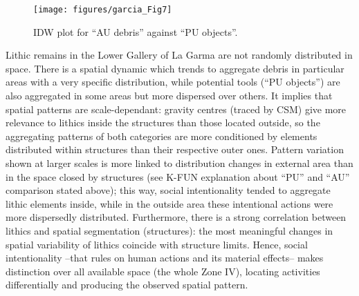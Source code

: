 \begin{figure}
	\texttt{[image: figures/garcia\_Fig7]}
	\centering
	\caption{IDW plot for “AU debris” against “PU objects”.}
	\label{fig:Garcia_Fig7}
\end{figure}


Lithic remains in the Lower Gallery of La Garma are not randomly distributed in space. There is a spatial dynamic which trends to aggregate debris in particular areas with a very specific distribution, while potential tools (“PU objects”) are also aggregated in some areas but more dispersed over others. It implies that spatial patterns are scale-dependant: gravity centres (traced by CSM) give more relevance to lithics inside the structures than those located outside, so the aggregating patterns of both categories are more conditioned by elements distributed within structures than their respective outer ones. Pattern variation shown at larger scales is more linked to distribution changes in external area than in the space closed by structures (see K-FUN explanation about “PU” and “AU” comparison stated above); this way, social intentionality tended to aggregate lithic elements inside, while in the outside area these intentional actions were more dispersedly distributed. Furthermore, there is a strong correlation between lithics and spatial segmentation (structures): the most meaningful changes in spatial variability of lithics coincide with structure limits. Hence, social intentionality –that rules on human actions and its material effects– makes distinction over all available space (the whole Zone IV), locating activities differentially and producing the observed spatial pattern.

